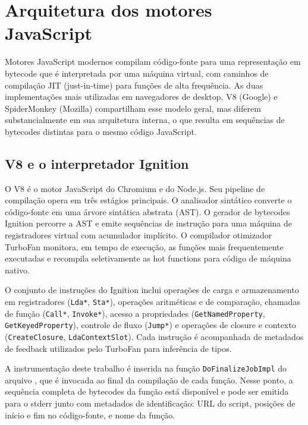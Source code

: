 \section{Arquitetura dos motores JavaScript}
\label{sec:motores}

Motores JavaScript modernos compilam código-fonte para uma representação em
bytecode que é interpretada por uma máquina virtual, com caminhos de compilação JIT
(just-in-time) para funções de alta frequência. As duas implementações mais
utilizadas em navegadores de desktop, V8 (Google) e SpiderMonkey (Mozilla)
compartilham esse modelo geral, mas diferem substancialmente em sua arquitetura
interna, o que resulta em sequências de bytecodes distintas para o mesmo código
JavaScript.

\subsection{V8 e o interpretador Ignition}
\label{sub:v8}

O V8 é o motor JavaScript do Chromium e do Node.js. Seu pipeline de compilação
opera em três estágios principais. O analisador sintático converte o código-fonte
em uma árvore sintática abstrata (AST). O gerador de bytecodes Ignition percorre a
AST e emite sequências de instrução para uma máquina de registradores virtual com
acumulador implícito. O compilador otimizador TurboFan monitora, em tempo de
execução, as funções mais frequentemente executadas e recompila seletivamente as
hot functions para código de máquina nativo.

O conjunto de instruções do Ignition inclui operações de carga e armazenamento em
registradores (\texttt{Lda*}, \texttt{Sta*}), operações aritméticas e de
comparação, chamadas de função (\texttt{Call*}, \texttt{Invoke*}), acesso a
propriedades (\texttt{GetNamedProperty}, \texttt{GetKeyedProperty}), controle de
fluxo (\texttt{Jump*}) e operações de closure e contexto (\texttt{CreateClosure},
\texttt{LdaContextSlot}). Cada instrução é acompanhada de metadados de
feedback utilizados pelo TurboFan para inferência de tipos.

A instrumentação deste trabalho é inserida na função \texttt{DoFinalizeJobImpl} do
arquivo , que é invocada ao final da compilação de cada
função. Nesse ponto, a sequência completa de bytecodes da função está disponível e
pode ser emitida para o stderr junto com metadados de identificação: URL do
script, posições de início e fim no código-fonte, e nome da função.

